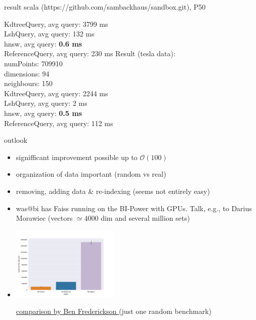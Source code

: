 \documentclass[xcolor=dvipsnames, aspectratio=1610]{beamer}
\newcommand{\alertA}[1]{\color{alertAcolor}#1\color{Black}}
\newcommand{\alertB}[1]{{\color{AlertcolB}#1}}
\newcommand{\gr}[1]{{\color{grcol}#1}}
\newcommand{\citeWork}[1]{ {\scriptsize{\color{Refcol} #1  \color{Black}}}}
\begin{document}
\begin{frame}[fragile]{result scala (https://github.com/sambackhaus/sandbox.git), P50}
{\begin{minipage}{0.40\textwidth}
\begin{flushleft}
KdtreeQuery, avg query: 3799 ms\\
LshQuery, avg query: 132 ms\\
hnsw, avg query: {\alertA{\bf{ 0.6 ms}}} \\
ReferenceQuery, avg query: 230 ms
\vspace{0.2cm}
Result (tesla data):\\
numPoints: 709910\\
dimensions: 94\\
neighbours: 150\\

KdtreeQuery, avg query: 2244 ms\\
LshQuery, avg query: 2 ms\\
hnsw, avg query: {\alertA{\bf{0.5 ms}}}\\
ReferenceQuery, avg query: 112 ms\\
\end{flushleft}
\end{minipage}
}
\end{frame}



\begin{frame}{outlook } 
\linespread{1}\small{
\begin{minipage}{0.99\textwidth}  

\begin{itemize}
\item signifficant improvement possible up to \alertA{$\mathcal O (100)$}
\item organization of data important \alertA{(random vs real)}
\item removing, adding data \& re-indexing \alertB{(seems not entirely easy)}
\item was@bi has Faiss running on the BI-Power with GPUs. Talk, e.g., to \alertB{Darius Morawiec} (vectors $\simeq 4000$ dim and several million sets)
\item \includegraphics[width=0.4\textwidth]{Figures/faiss_gpu.png} 

\href{https://www.benfrederickson.com/approximate-nearest-neighbours-for-recommender-systems/}{\citeWork{comparison by Ben Frederickson}} \gr{(just one random benchmark)}
\end{itemize}
\end{minipage}
}
\end{frame}
\end{document}
